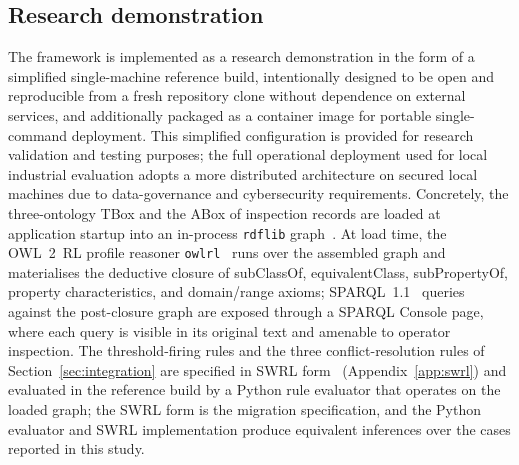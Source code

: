 \documentclass[11pt,a4paper]{article}
\begin{document}
\subsection{Research demonstration}
\label{sec:res_demo}

The framework is implemented as a research demonstration in the form of a simplified single-machine reference build, intentionally designed to be open and reproducible from a fresh repository clone without dependence on external services, and additionally packaged as a container image for portable single-command deployment. This simplified configuration is provided for research validation and testing purposes; the full operational deployment used for local industrial evaluation adopts a more distributed architecture on secured local machines due to data-governance and cybersecurity requirements.
Concretely, the three-ontology TBox and the ABox of inspection records are loaded at application startup into an in-process \texttt{rdflib} graph~\citep{rdflib}.  At load time, the OWL~2~RL profile reasoner \texttt{owlrl}~\citep{owlrl} runs over the assembled graph and materialises the deductive closure of subClassOf, equivalentClass, subPropertyOf, property characteristics, and domain/range axioms; SPARQL~1.1~\citep{w3c2013sparql11} queries against the post-closure graph are exposed through a SPARQL Console page, where each query is visible in its original text and amenable to operator inspection. The threshold-firing rules and the three conflict-resolution rules of Section~\ref{sec:integration} are specified in SWRL form~\citep{horrocks2004swrl} (Appendix~\ref{app:swrl}) and evaluated in the reference build by a Python rule evaluator that operates on the loaded graph; the SWRL form is the migration specification, and the Python evaluator and SWRL implementation produce equivalent inferences over the cases reported in this study.
\end{document}
